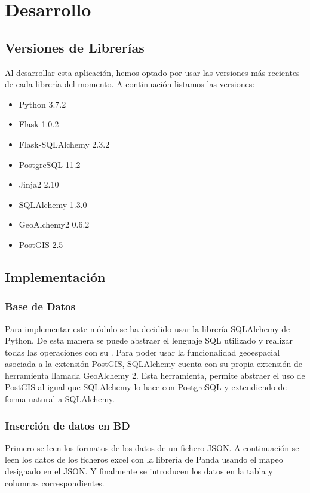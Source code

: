 \chapter{Desarrollo\label{CAP:DESARROLLO}}
  \section{Versiones de Librerías}
    Al desarrollar esta aplicación, hemos optado por usar las versiones más recientes de cada librería del momento. A continuación listamos las versiones:
    \begin{itemize}
      \item Python 3.7.2
      \item Flask 1.0.2
      \item Flask-SQLAlchemy 2.3.2
      \item PostgreSQL 11.2
      \item Jinja2 2.10
      \item SQLAlchemy 1.3.0 
      \item GeoAlchemy2 0.6.2
      \item PostGIS 2.5
    \end{itemize}
  \section{Implementación}
    \subsection{Base de Datos}
      Para implementar este módulo se ha decidido usar la librería SQLAlchemy\cite{sqlalchemy} de Python. De esta manera se puede abstraer el lenguaje SQL utilizado y realizar todas las operaciones con su . 
      Para poder usar la funcionalidad geoespacial asociada a la extensión PostGIS, SQLAlchemy cuenta con su propia extensión de herramienta llamada GeoAlchemy 2\cite{geoalchemy}. Esta herramienta, permite abstraer el uso de PostGIS al igual que SQLAlchemy lo hace con PostgreSQL y extendiendo de forma natural a SQLAlchemy.
    \subsection{Inserción de datos en BD}
      Primero se leen los formatos de los datos de un fichero JSON.
      A continuación se leen los datos de los ficheros excel con la librería de Panda usando el mapeo designado en el JSON.
      Y finalmente se introducen los datos en la tabla y columnas correspondientes.